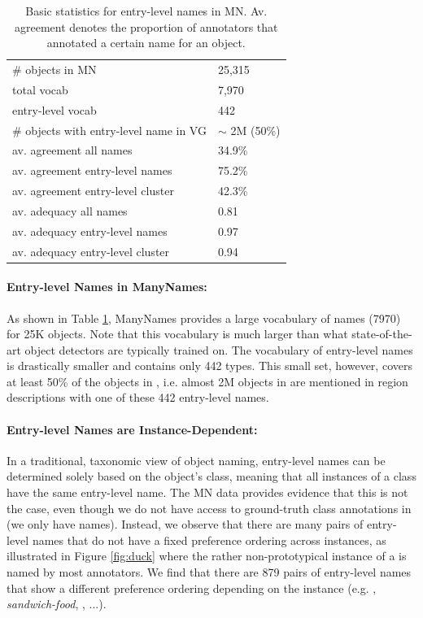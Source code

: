 \begin{table}[t]
	\centering
	\small
	\begin{tabular}{p{5cm}l}
		\toprule		
		\# objects in MN & 25,315\\
		total vocab  &  7,970\\
		entry-level vocab & 442\\
		\# objects with entry-level name in VG & $\sim$ 2M (50\%)\\
		\midrule
		av. agreement all names & 34.9\%\\
		av. agreement entry-level names & 75.2\%\\
		av. agreement entry-level cluster & 42.3\%\\
		\midrule
		av. adequacy all names & 0.81\\
		av. adequacy entry-level names & 0.97 \\
		av. adequacy entry-level cluster & 0.94 \\
		\bottomrule	
	\end{tabular}
	\caption{Basic statistics for entry-level names in MN. Av. agreement denotes the proportion of annotators that annotated a certain name for an object. }
	\label{tab:stat-entry-level}
\end{table}

\paragraph{Entry-level Names in ManyNames:} As shown in Table \ref{tab:stat-entry-level}, ManyNames provides a large vocabulary of names (7970) for 25K objects. Note that this vocabulary is much larger than what state-of-the-art object detectors are typically trained on. The vocabulary of entry-level names is drastically smaller and contains only 442 types. This small set, however, covers at least 50\% of the objects in \vg, i.e. almost 2M objects in \vg are mentioned in region descriptions with one of these 442 entry-level names. 

\paragraph{Entry-level Names are Instance-Dependent:} 
In a traditional, taxonomic view of object naming, entry-level names can be determined solely based on the object's class, meaning that all instances of a class have the same entry-level name. The MN data provides evidence that this is not the case, even though we do not have access to ground-truth class annotations in \vg (we only have names). Instead, we observe that there are many pairs of entry-level names that do not have a fixed preference ordering across instances, as illustrated in Figure \ref{fig:duck} where the rather non-prototypical instance of a  is named  by most annotators. We find that there are 879 pairs of entry-level names that show a different preference ordering depending on the instance (e.g. , \textit{sandwich-food}, , ...).

